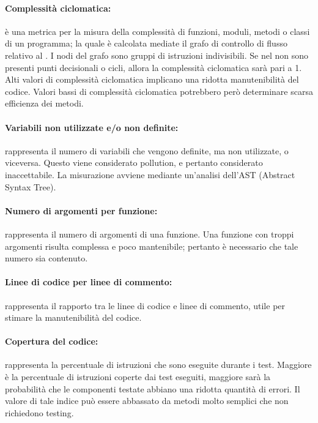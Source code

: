 \paragraph{Complessità ciclomatica:} è una metrica per la misura della complessità di funzioni, moduli, metodi o classi di un programma; la quale è calcolata mediate il grafo di controllo di flusso relativo al .
            I nodi del grafo sono gruppi di istruzioni indivisibili. Se nel  non sono presenti punti decisionali o cicli, allora la complessità ciclomatica sarà pari a 1.
            Alti valori di complessità ciclomatica implicano una ridotta manutenibilità del codice. Valori bassi di complessità ciclomatica potrebbero però determinare scarsa efficienza dei metodi.

\paragraph{Variabili non utilizzate e/o non definite:} rappresenta il numero di variabili che vengono definite, ma non utilizzate, o viceversa. Questo viene considerato pollution, e pertanto considerato inaccettabile. La misurazione avviene mediante un’analisi dell’AST (Abstract Syntax Tree).

\paragraph{Numero di argomenti per funzione:} rappresenta il numero di argomenti di una funzione. Una funzione con troppi argomenti risulta complessa e poco mantenibile; pertanto è necessario che tale numero sia contenuto.

\paragraph{Linee di codice per linee di commento:} rappresenta il rapporto tra le linee di codice e linee di commento, utile per stimare la manutenibilità del codice.

\paragraph{Copertura del codice:} rappresenta la percentuale di istruzioni che sono eseguite durante i test. Maggiore è la percentuale di istruzioni coperte dai test eseguiti, maggiore sarà la probabilità
che le componenti testate abbiano una ridotta quantità di errori. Il valore di tale indice può essere abbassato da metodi molto semplici che non richiedono testing.
